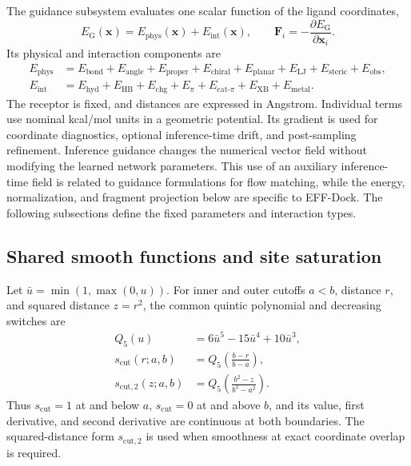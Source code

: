 \documentclass{article}
\newcommand{\method}{EFF-Dock\xspace}
\newcommand{\citep}[1]{\cite{#1}}
\begin{document}
The guidance subsystem evaluates one scalar function of the ligand coordinates,
\begin{equation}
    E_{\mathrm{G}}(\mathbf{x})
    =E_{\mathrm{phys}}(\mathbf{x})+E_{\mathrm{int}}(\mathbf{x}),
    \qquad
    \mathbf{F}_i=-\frac{\partial E_{\mathrm{G}}}{\partial\mathbf{x}_i}.
    \label{eq:si_guidance_total}
\end{equation}
Its physical and interaction components are
\begin{align}
    E_{\mathrm{phys}}
    &=E_{\mathrm{bond}}+E_{\mathrm{angle}}+E_{\mathrm{proper}}
      +E_{\mathrm{chiral}}+E_{\mathrm{planar}}
      +E_{\mathrm{LJ}}+E_{\mathrm{steric}}+E_{\mathrm{obs}},\nonumber\\
    E_{\mathrm{int}}
    &=E_{\mathrm{hyd}}+E_{\mathrm{HB}}+E_{\mathrm{chg}}
      +E_{\pi}+E_{\mathrm{cat}\text{-}\pi}
      +E_{\mathrm{XB}}+E_{\mathrm{metal}}.
    \label{eq:si_guidance_components}
\end{align}
The receptor is fixed, and distances are expressed in Angstrom.
Individual terms use nominal kcal/mol units in a geometric potential.
Its gradient is used for coordinate diagnostics, optional inference-time drift, and post-sampling refinement.
Inference guidance changes the numerical vector field without modifying the learned network parameters.
This use of an auxiliary inference-time field is related to guidance formulations for flow matching, while the energy, normalization, and fragment projection below are specific to \method \citep{feng2025flowguidance}.
The following subsections define the fixed parameters and interaction types.

\subsection{Shared smooth functions and site saturation}

Let \(\bar u=\min(1,\max(0,u))\).
For inner and outer cutoffs \(a<b\), distance \(r\), and squared distance \(z=r^2\), the common quintic polynomial and decreasing switches are
\begin{align}
    Q_5(u)&=6\bar u^5-15\bar u^4+10\bar u^3,\\
    s_{\mathrm{cut}}(r;a,b)&=Q_5\left(\frac{b-r}{b-a}\right),\\
    s_{\mathrm{cut},2}(z;a,b)&=Q_5\left(\frac{b^2-z}{b^2-a^2}\right).
    \label{eq:si_switches}
\end{align}
Thus \(s_{\mathrm{cut}}=1\) at and below \(a\), \(s_{\mathrm{cut}}=0\) at and above \(b\), and its value, first derivative, and second derivative are continuous at both boundaries.
The squared-distance form \(s_{\mathrm{cut},2}\) is used when smoothness at exact coordinate overlap is required.
\end{document}
